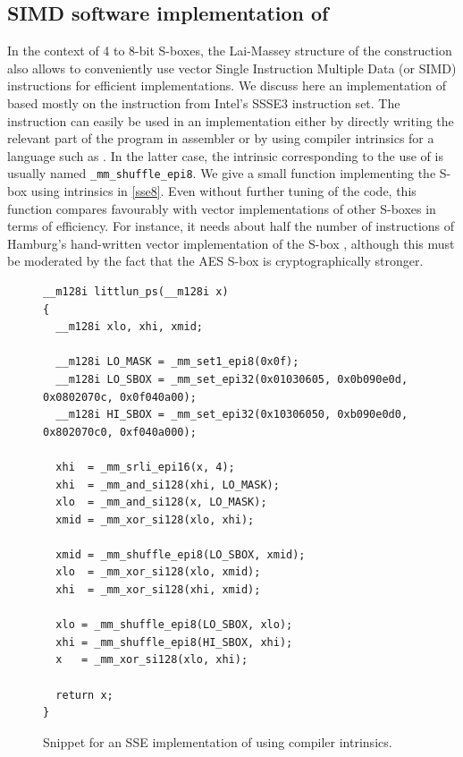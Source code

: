 \FloatBarrier

\subsection{SIMD software implementation of \littlunOne}
\label{sec:simdimplem}

In the context of 4 to 8-bit S-boxes, the Lai-Massey structure of the \littlun construction also allows to conveniently use vector Single Instruction Multiple Data (or SIMD) instructions for
efficient implementations. We discuss here an implementation of \littlunOne based mostly on the \pshufb instruction from Intel's SSSE3 instruction set.
The \pshufb instruction can easily be used in an implementation either by directly writing the relevant part of the program in assembler
or by using compiler intrinsics for a language such as \C. In the latter case, the intrinsic corresponding to the use of \pshufb is usually named \texttt{\_mm\_shuffle\_epi8}.
We give a small function implementing the \littlunOne S-box using \C intrinsics in \autoref{sse8}. Even without further tuning of the code, this function compares favourably with vector implementations
of other S-boxes in terms of efficiency. For instance, it needs about half the number of instructions of Hamburg's hand-written vector implementation of the \aes S-box \cite{vpaes}, although
this must be moderated by the fact that the AES S-box is cryptographically stronger.

\begin{figure}[ht]
\begin{verbatim}
__m128i littlun_ps(__m128i x)
{
  __m128i xlo, xhi, xmid;

  __m128i LO_MASK = _mm_set1_epi8(0x0f);
  __m128i LO_SBOX = _mm_set_epi32(0x01030605, 0x0b090e0d, 0x0802070c, 0x0f040a00);
  __m128i HI_SBOX = _mm_set_epi32(0x10306050, 0xb090e0d0, 0x802070c0, 0xf040a000);

  xhi  = _mm_srli_epi16(x, 4);
  xhi  = _mm_and_si128(xhi, LO_MASK);
  xlo  = _mm_and_si128(x, LO_MASK);
  xmid = _mm_xor_si128(xlo, xhi);

  xmid = _mm_shuffle_epi8(LO_SBOX, xmid);
  xlo  = _mm_xor_si128(xlo, xmid);
  xhi  = _mm_xor_si128(xhi, xmid);

  xlo = _mm_shuffle_epi8(LO_SBOX, xlo);
  xhi = _mm_shuffle_epi8(HI_SBOX, xhi);
  x   = _mm_xor_si128(xlo, xhi);

  return x;
}
\end{verbatim}
\caption{Snippet for an SSE \C implementation of \littlunOne using compiler intrinsics.\label{sse8}}
\end{figure}

